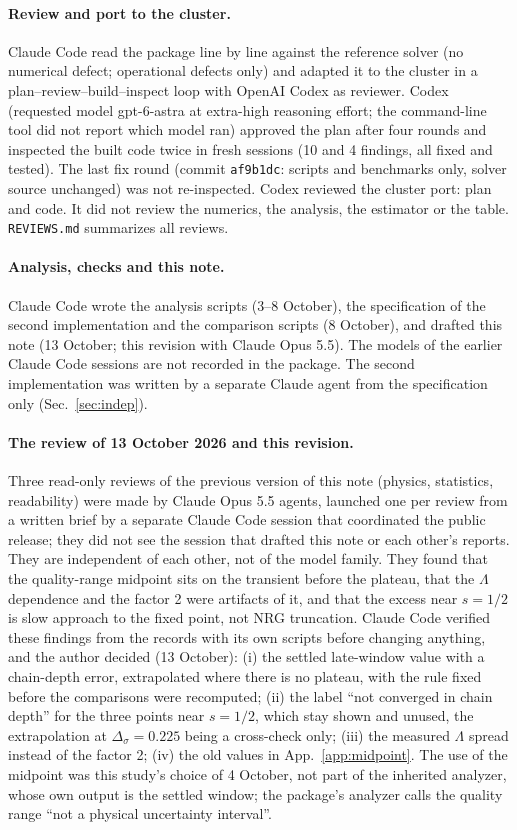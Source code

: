 \documentclass[10pt,a4paper]{article}
\newcommand{\Ds}{\Delta_\sigma}
\newcommand{\code}[1]{\texttt{#1}}
\begin{document}
\paragraph{Review and port to the cluster.} Claude Code read the package line by line against the reference solver (no numerical
defect; operational defects only) and adapted it to the cluster in a plan--review--build--inspect loop with OpenAI Codex as reviewer.
Codex (requested model gpt-6-astra at extra-high reasoning effort; the command-line tool did not report which model ran) approved the
plan after four rounds and inspected the built code twice in fresh sessions (10 and 4 findings, all fixed and tested). The last fix
round (commit \code{af9b1dc}: scripts and benchmarks only, solver source unchanged) was not re-inspected. Codex reviewed the cluster port:
plan and code. It did not review the numerics, the analysis, the estimator or the table. \code{REVIEWS.md} summarizes all reviews.

\paragraph{Analysis, checks and this note.} Claude Code wrote the analysis scripts (3--8 October), the specification of the second
implementation and the comparison scripts (8 October), and drafted this note (13 October; this revision with Claude Opus 5.5). The
models of the earlier Claude Code sessions are not recorded in the package. The second implementation was written by a separate Claude
agent from the specification only (Sec.~\ref{sec:indep}).

\paragraph{The review of 13 October 2026 and this revision.} Three read-only reviews of the previous version of this note (physics,
statistics, readability) were made by Claude Opus 5.5 agents, launched one per review from a written brief by a separate Claude Code
session that coordinated the public release; they did not see the session that drafted this note or each other's reports. They are
independent of each other,
not of the model family. They found that the quality-range midpoint sits on the transient before the plateau, that the
$\Lambda$ dependence and the factor 2 were artifacts of it, and that the excess near $s=1/2$ is slow approach to the fixed point, not
NRG truncation. Claude Code verified these findings from the records with its own scripts before changing anything, and the author
decided (13 October): (i) the settled late-window value with a chain-depth error, extrapolated where there is no plateau, with the rule
fixed before the comparisons were recomputed; (ii) the label ``not converged in chain depth'' for the three points near $s=1/2$, which
stay shown and unused, the extrapolation at $\Ds=0.225$ being a cross-check only; (iii) the measured $\Lambda$ spread instead of the
factor 2; (iv) the old values in App.~\ref{app:midpoint}. The use of the midpoint was this study's choice of 4 October, not part of the
inherited analyzer, whose own output is the settled window; the package's analyzer calls the quality range ``not a physical
uncertainty interval''.
\end{document}
